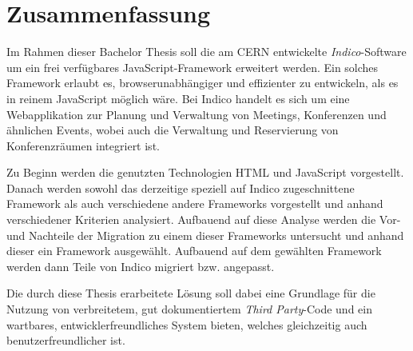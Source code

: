 \chapter*{Zusammenfassung}
\thispagestyle{empty}

Im Rahmen dieser Bachelor Thesis soll die am CERN entwickelte \emph{Indico}-Software um ein
frei verfügbares JavaScript-Framework erweitert werden. Ein solches Framework erlaubt es,
browserunabhängiger und effizienter zu entwickeln, als es in reinem JavaScript möglich wäre. Bei
Indico handelt es sich um eine Webapplikation zur Planung und Verwaltung von Meetings, Konferenzen
und ähnlichen Events, wobei auch die Verwaltung und Reservierung von Konferenzräumen integriert ist.

Zu Beginn werden die genutzten Technologien HTML und JavaScript vorgestellt. Danach werden sowohl
das derzeitige speziell auf Indico zugeschnittene Framework als auch verschiedene andere Frameworks
vorgestellt und anhand verschiedener Kriterien analysiert. Aufbauend auf diese Analyse werden die
Vor- und Nachteile der Migration zu einem dieser Frameworks untersucht und anhand dieser ein
Framework ausgewählt. Aufbauend auf dem gewählten Framework werden dann Teile von Indico migriert
bzw. angepasst.

Die durch diese Thesis erarbeitete Lösung soll dabei eine Grundlage für die Nutzung von
verbreitetem, gut dokumentiertem \emph{Third Party}-Code und ein wartbares, entwicklerfreundliches
System bieten, welches gleichzeitig auch benutzerfreundlicher ist.
